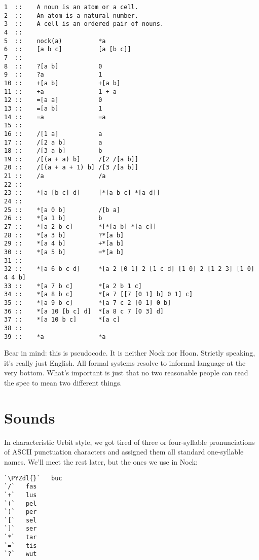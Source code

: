 \begin{framed_shaded}
\begin{Verbatim}[fontsize=\relsize{-2.5},fontseries=b,commandchars=\\\{\}]
1  ::    A noun is an atom or a cell.
2  ::    An atom is a natural number.
3  ::    A cell is an ordered pair of nouns.
4  ::
5  ::    nock(a)          *a
6  ::    [a b c]          [a [b c]]
7  ::
8  ::    ?[a b]           0
9  ::    ?a               1
10 ::    +[a b]           +[a b]
11 ::    +a               1 + a
12 ::    =[a a]           0
13 ::    =[a b]           1
14 ::    =a               =a
15 ::
16 ::    /[1 a]           a
17 ::    /[2 a b]         a
18 ::    /[3 a b]         b
19 ::    /[(a + a) b]     /[2 /[a b]]
20 ::    /[(a + a + 1) b] /[3 /[a b]]
21 ::    /a               /a
22 ::
23 ::    *[a [b c] d]     [*[a b c] *[a d]]
24 ::
25 ::    *[a 0 b]         /[b a]
26 ::    *[a 1 b]         b
27 ::    *[a 2 b c]       *[*[a b] *[a c]]
28 ::    *[a 3 b]         ?*[a b]
29 ::    *[a 4 b]         +*[a b]
30 ::    *[a 5 b]         =*[a b]
31 ::
32 ::    *[a 6 b c d]     *[a 2 [0 1] 2 [1 c d] [1 0] 2 [1 2 3] [1 0] 4 4 b]
33 ::    *[a 7 b c]       *[a 2 b 1 c]
34 ::    *[a 8 b c]       *[a 7 [[7 [0 1] b] 0 1] c]
35 ::    *[a 9 b c]       *[a 7 c 2 [0 1] 0 b]
36 ::    *[a 10 [b c] d]  *[a 8 c 7 [0 3] d]
37 ::    *[a 10 b c]      *[a c]
38 ::
39 ::    *a               *a
\end{Verbatim}
\end{framed_shaded}

Bear in mind: this is pseudocode.  It is neither Nock nor Hoon.
Strictly speaking, it's really just English.  All formal systems
resolve to informal language at the very bottom.  What's
important is just that no two reasonable people can read the spec
to mean two different things.

\section{Sounds}

In characteristic Urbit style, we got tired of three or
four-syllable pronunciations of ASCII punctuation characters and
assigned them all standard one-syllable names.  We'll meet the
rest later, but the ones we use in Nock:

\begin{framed_shaded}
\begin{Verbatim}[fontsize=\relsize{-2.5},fontseries=b,commandchars=\\\{\}]
`\PYZdl{}`   buc
`/`   fas
`+`   lus
`(`   pel
`)`   per
`[`   sel
`]`   ser
`*`   tar
`=`   tis
`?`   wut
\end{Verbatim}
\end{framed_shaded}


